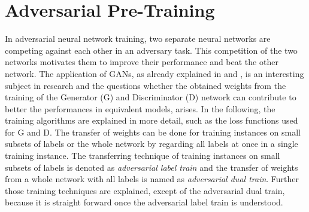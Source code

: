 
\section{Adversarial Pre-Training}\label{sec:nn_adv}
In adversarial neural network training, two separate neural networks are competing against each other in an adversary task.
This competition of the two networks motivates them to improve their performance and beat the other network.
The application of GANs, as already explained in  and , is an interesting subject in research and the questions whether the obtained weights from the training of the Generator (G) and Discriminator (D) network can contribute to better the performances in equivalent models, arises.
In the following, the training algorithms are explained in more detail, such as the loss functions used for G and D.
The transfer of weights can be done for training instances on small subsets of labels or the whole network by regarding all labels at once in a single training instance.
The transferring technique of training instances on small subsets of labels is denoted as \emph{adversarial label train} and the transfer of weights from a whole network with all labels is named as \emph{adversarial dual train}.
Further those training techniques are explained, except of the adversarial dual train, because it is straight forward once the adversarial label train is understood.



